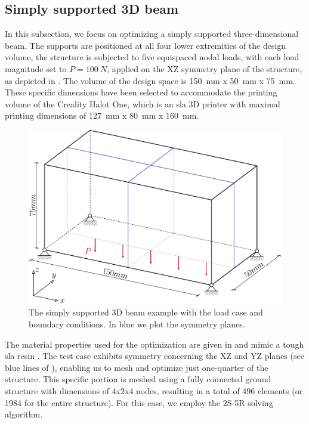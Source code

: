 \subsection{Simply supported 3D beam} \label{sec:04_simply_supp}
In this subsection, we focus on optimizing a simply supported three-dimensional beam. The supports are positioned at all four lower extremities of the design volume, the structure is subjected to five equispaced nodal loads, with each load magnitude set to $P=\qty{100}{N}$, applied on the XZ symmetry plane of the structure, as depicted in . The volume of the design space is \qty{150}{mm} x \qty{50}{mm} x \qty{75}{mm}. These specific dimensions have been selected to accommodate the printing volume of the Creality Halot One, which is an \gls{sla} 3D printer with maximal printing dimensions of \qty{127}{mm} x \qty{80}{mm} x \qty{160}{mm}.
\begin{figure}
    \centering
    \includegraphics[width=0.8\linewidth]{figures/04_TTO_improvements/14_supported_3D_BCs/supported_3D.pdf}
    \caption{The simply supported 3D beam example with the load case and boundary conditions. In blue we plot the symmetry planes.}
    \label{fig:04_simply3D_BC}
\end{figure}
The material properties used for the optimization are given in  and mimic a tough \gls{sla} resin . The test case exhibits symmetry concerning the XZ and YZ planes (see blue lines of ), enabling us to mesh and optimize just one-quarter of the structure. This specific portion is meshed using a fully connected ground structure with dimensions of 4x2x4 nodes, resulting in a total of 496 elements (or 1984 for the entire structure). For this case, we employ the 2S-5R solving algorithm.

